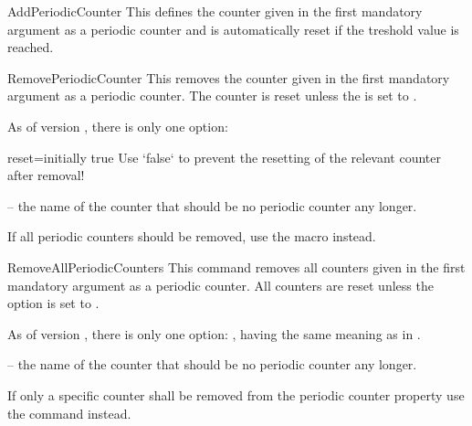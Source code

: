 \documentclass[12pt,a4paper,oneside]{article}
\makeatletter
\newcommand{\chdocextractversion}[1]{%
  \@nameuse{#1}%
}
\newcommand{\CHDocNew}[1]{%
  \tcbdocmarginnote[doclang/new={N},
  colframe=blue,
  halign=left,
  colback={blue!20!white},
  fontupper={\tiny}
  ]{%
    \chdocextractversion{xassoccntversion#1}%
  }%
}
\def\packageversion{\xassoccntpackageversion}%
\makeatother
\begin{document}
\begin{docCommand}[before={\CHDocNew{0.9}}]{AddPeriodicCounter}{\oarg{}}
This defines the counter given in the first mandatory argument as a periodic counter and is automatically reset if the treshold value is reached. 
\end{docCommand}


\begin{docCommand}[before={\CHDocNew{0.9}}]{RemovePeriodicCounter}{}
This removes the counter given in the first mandatory argument as a periodic counter. The counter is reset unless the  is set to . 

\begin{codeoptionsenum}
\item {} 

  As of version \packageversion, there is only one option: 
  
  \begin{docKey}[][before={\CHDocNew{0.9}}]{reset}{=}{initially true}
      Use `false` to prevent the resetting of the relevant counter after removal! 
    \end{docKey}
  \item {} -- the name of the counter that should be no periodic counter any longer. 
\end{codeoptionsenum}

If all periodic counters should be removed, use the macro  instead. 

\end{docCommand}

\begin{docCommand}[before={\CHDocNew{1.0}}]{RemoveAllPeriodicCounters}{}
  This command removes all counters given in the first mandatory argument as a periodic counter. All counters are reset unless the  option is set to . 

\begin{codeoptionsenum}
\item {} 
  As of version \packageversion, there is only one option: , having the same meaning as in .
\item {} -- the name of the counter that should be no periodic counter any longer. 
\end{codeoptionsenum}

If only a specific counter shall be removed from the periodic counter property use the command  instead. 

\end{docCommand}
\end{document}
